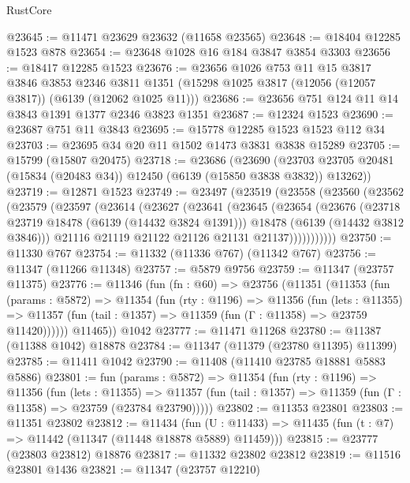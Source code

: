 \begin{lexlean}{RustCore}
\begin{coremodule}
@23645 := @11471 @23629 @23632 (@11658 @23565)
@23648 := @18404 @12285 @1523 @878
@23654 := @23648 @1028 @16 @184 @3847 @3854 @3303
@23656 := @18417 @12285 @1523
@23676 := @23656
    @1026
    @753
    @11
    @15
    @3817
    @3846
    @3853
    @2346
    @3811
    @1351
    (@15298 @1025 @3817 (@12056 (@12057 @3817)) (@6139 (@12062 @1025 @11)))
@23686 := @23656 @751 @124 @11 @14 @3843 @1391 @1377 @2346 @3823 @1351
@23687 := @12324 @1523
@23690 := @23687 @751 @11 @3843
@23695 := @15778 @12285 @1523 @1523 @112 @34
@23703 := @23695 @34 @20 @11 @1502 @1473 @3831 @3838 @15289
@23705 := @15799 (@15807 @20475)
@23718 := @23686
    (@23690 (@23703 @23705 @20481 (@15834 (@20483 @34)) @12450 (@6139 (@15850 @3838 @3832)) @13262))
@23719 := @12871 @1523
@23749 := @23497
    (@23519
      (@23558
        (@23560
          (@23562
            (@23579
              (@23597
                (@23614
                  (@23627
                    (@23641
                      (@23645
                        (@23654
                          (@23676
                            (@23718 @23719 @18478 (@6139 (@14432 @3824 @1391)))
                            @18478
                            (@6139 (@14432 @3812 @3846)))
                          @21116
                          @21119
                          @21122
                          @21126
                          @21131
                          @21137)))))))))))
@23750 := @11330 @767
@23754 := @11332 (@11336 @767) (@11342 @767)
@23756 := @11347 (@11266 @11348)
@23757 := @5879 @9756
@23759 := @11347 (@23757 @11375)
@23776 := @11346
    (fun (fn : @60) =>
    @23756
      (@11351
        (@11353
          (fun (params : @5872) =>
          @11354
            (fun (rty : @1196) =>
            @11356
              (fun (lets : @11355) =>
              @11357 (fun (tail : @1357) => @11359 (fun (Γ : @11358) => @23759 @11420))))))
        @11465))
    @1042
@23777 := @11471 @11268
@23780 := @11387 (@11388 @1042) @18878
@23784 := @11347 (@11379 (@23780 @11395) @11399)
@23785 := @11411 @1042
@23790 := @11408 (@11410 @23785 @18881 @5883 @5886)
@23801 := fun (params : @5872) =>
  @11354
    (fun (rty : @1196) =>
    @11356
      (fun (lets : @11355) =>
      @11357 (fun (tail : @1357) => @11359 (fun (Γ : @11358) => @23759 (@23784 @23790)))))
@23802 := @11353 @23801
@23803 := @11351 @23802
@23812 := @11434
    (fun (U : @11433) => @11435 (fun (t : @7) => @11442 (@11347 (@11448 @18878 @5889) @11459)))
@23815 := @23777 (@23803 @23812) @18876
@23817 := @11332 @23802 @23812
@23819 := @11516 @23801 @1436
@23821 := @11347 (@23757 @12210)

\end{coremodule}
\end{lexlean}
